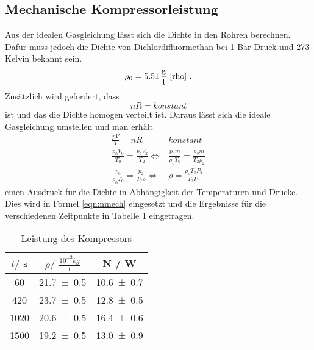\subsection{Mechanische Kompressorleistung}
Aus der idealen Gasgleichung lässt sich die Dichte in den Rohren berechnen. Dafür muss jedoch die Dichte von Dichlordifluormethan bei 1 Bar Druck und 273 Kelvin bekannt sein.
\begin{equation}
  \rho_\text{0} =  5.51 \, \frac{\text{g}}{\text{l}} \ \text{\cite{rho}} \ .
  \label{rho}
\end{equation}
Zusätzlich wird gefordert, dass
\begin{equation}
  nR = konstant
\end{equation}
ist und das die Dichte homogen verteilt ist. Daraus lässt sich die ideale Gasgleichung umstellen und man erhält
\begin{eqnarray*}
  \frac{pV}{T} =nR =& konstant \\
  \frac{p_0 V_0}{T_0} = \frac{p_2 V_2}{T_\text{2}}  \Leftrightarrow&  \frac{p_0 m}{\rho_0 T_0} = \frac{p_2 m}{T_\text{2} \rho_2} \\
  \frac{p_0}{\rho_0 T_0} = \frac{p_2}{T_\text{2} \rho} \Leftrightarrow& \rho = \frac{\rho_o T_o P_2}{T_\text{2} P_0}
  \label{eqn:rho}
\end{eqnarray*}
einen Ausdruck für die Dichte in Abhängigkeit der Temperaturen und Drücke. Dies wird in Formel \ref{eqn:nmech} eingesetzt und die Ergebnisse für die verschiedenen Zeitpunkte in Tabelle \ref{tab:LdK} eingetragen.
\begin{table}
  \centering
  \begin{tabular}{c c c}
    \toprule
    $t /$ s & $\rho /$ $\frac{10^{-3}kg}{l}$ & N / W \\
    \midrule
    60   & \num{21.7 +- 0.5} & \num{10.6 +- 0.7} \\
    420  & \num{23.7 +- 0.5} & \num{12.8 +- 0.5} \\
    1020 & \num{20.6 +- 0.5} & \num{16.4 +- 0.6} \\
    1500 & \num{19.2 +- 0.5} & \num{13.0 +- 0.9} \\
    \bottomrule
  \end{tabular}
  \caption{Leistung des Kompressors}
  \label{tab:LdK}
\end{table}
